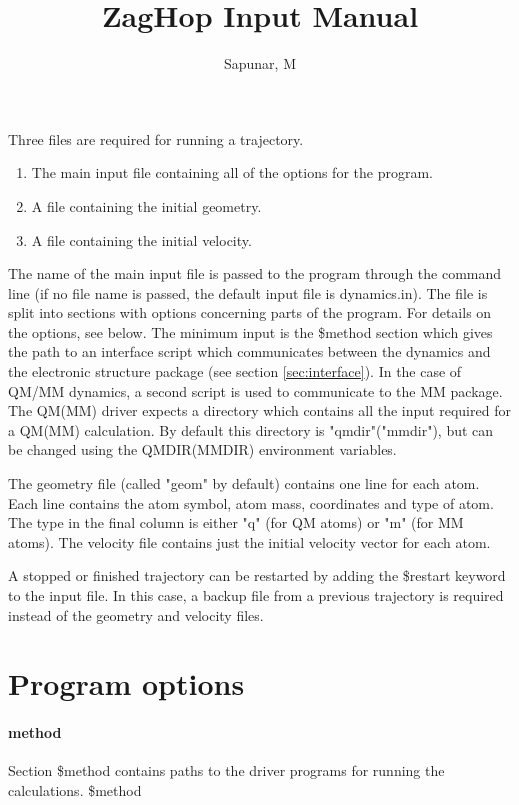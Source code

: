 \documentclass{report}
\title{ZagHop Input Manual}
\author{Sapunar, M}
\begin{document}
\maketitle

Three files are required for running a trajectory.
\begin{enumerate}
	\item The main input file containing all of the options for the program.
	\item A file containing the initial geometry.
	\item A file containing the initial velocity.
\end{enumerate}

The name of the main input file is passed to the program through the command line (if no file name is passed, the default input file is dynamics.in). The file is split into sections with options concerning parts of the program. For details on the options, see below. The minimum input is the \$method section which gives the path to an interface script which communicates between the dynamics and the electronic structure package (see section \ref{sec:interface}).
In the case of QM/MM dynamics, a second script is used to communicate to the MM package. The QM(MM) driver expects a directory which contains all the input required for a QM(MM) calculation. By default this directory is "qmdir"("mmdir"), but can be changed using the QMDIR(MMDIR) environment variables.

The geometry file (called "geom" by default) contains one line for each atom. Each line contains the atom symbol, atom mass, coordinates and type of atom. The type in the final column is either "q" (for QM atoms) or "m" (for MM atoms). The velocity file contains just the initial velocity vector for each atom.

A stopped or finished trajectory can be restarted by adding the \$restart keyword to the input file. In this case, a backup file from a previous trajectory is required instead of the geometry and velocity files.

\section*{Program options} \label{sec:options}
\paragraph{method}
Section \$method contains paths to the driver programs for running the calculations.  \newline
\$method
\end{document}
